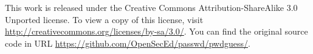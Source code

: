 This work is released under the Creative Commons Attribution-ShareAlike 3.0 
Unported license.
To view a copy of this license, visit 
\url{http://creativecommons.org/licenses/by-sa/3.0/}.
You can find the original source code in URL 
\url{https://github.com/OpenSecEd/passwd/pwdguess/}.


